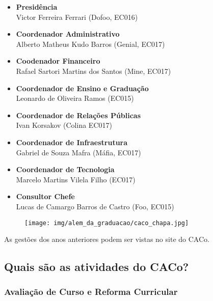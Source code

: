 \begin{itemize}
\item \textbf{Presidência}
  \\Victor Ferreira Ferrari (Dofoo, EC016)

\item \textbf{Coordenador Administrativo}
  \\Alberto Matheus Kudo Barros (Genial, EC017)

\item \textbf{Coodenador Financeiro}
  \\Rafael Sartori Martins dos Santos (Mine, EC017)

\item \textbf{Coordenador de Ensino e Graduação}
  \\Leonardo de Oliveira Ramos (EC015)

\item \textbf{Coordenador de Relações Públicas}
  \\Ivan Korsakov (Colina EC017)

\item \textbf{Coordenador de Infraestrutura}
  \\Gabriel de Souza Mafra (Máfia, EC017)

\item \textbf{Coordenador de Tecnologia}
  \\Marcelo Martins Vilela Filho (EC017)

\item \textbf{Consultor Chefe}
  \\Lucas de Camargo Barros de Castro (Foo, EC015)
\end{itemize}

\begin{figure}[H]
  \centering
  \texttt{[image: img/alem\_da\_graduacao/caco\_chapa.jpg]}
\end{figure}

As gestões dos anos anteriores podem ser vistas no site do CACo.

\subsection{Quais são as atividades do CACo?}

\subsubsection{Avaliação de Curso e Reforma Curricular}

